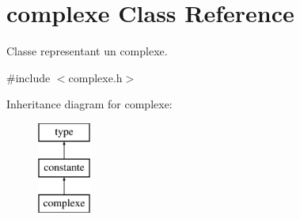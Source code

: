\hypertarget{classcomplexe}{\section{complexe Class Reference}
\label{classcomplexe}
}


Classe representant un complexe.  




{\ttfamily \#include $<$complexe.\-h$>$}

Inheritance diagram for complexe\-:\begin{figure}[H]
\begin{center}
\leavevmode
\includegraphics[height=3.000000cm]{classcomplexe}
\end{center}
\end{figure}
